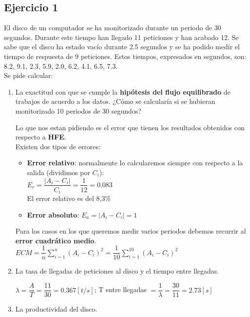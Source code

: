 \subsection{Ejercicio 1}
El disco de un computador se ha monitorizado durante un periodo de 30 segundos. Durante este tiempo
han llegado 11 peticiones y han acabado 12. Se sabe que el disco ha estado vacío durante 2.5 segundos y
se ha podido medir el tiempo de respuesta de 9 peticiones. Estos tiempos, expresados en segundos, son:\\
8.2, 9.1, 2.3, 5.9, 2.0, 6.2, 4.1, 6.5, 7.3. \\Se pide calcular:
\begin{enumerate}
    \item La exactitud con que se cumple la \textbf{hipótesis del flujo equilibrado} de trabajos de acuerdo a los datos. ¿Cómo se calcularía si se hubieran monitorizado 10 periodos de 30 segundos?
        \begin{tcolorbox}[colback=white,colframe=cyan!50!black,fonttitle=\bfseries]
        Lo que nos estan pidiendo es el error que tienen los resultados obtenidos con respecto a \textbf{HFE}.\\
        Existen dos tipos de errores:
        \begin{itemize}
            \item \textbf{Error relativo}: normalmente lo calcularemos siempre con respecto a la salida (dividimos por $C_i$):\\ $E_r=\dfrac{|A_i - C_i|}{C_i}=\dfrac{1}{12}=0.083$\\
            El error relativo es del 8,3\%
            \item \textbf{Error absoluto}: $E_a=|A_i-C_i|=1$
        \end{itemize}
        Para los casos en los que queremos medir varios periodos debemos recurrir al \textbf{error cuadrático medio}. $ECM = \dfrac{1}{n}\sum_{i=1}^{n}(A_i - C_i)^2 = \dfrac{1}{10}\sum_{i=1}^{10}(A_i - C_i)^2$
        \end{tcolorbox}
    \item La tasa de llegadas de peticiones al disco y el tiempo entre llegadas.
    \begin{tcolorbox}[colback=white,colframe=cyan!50!black,fonttitle=\bfseries]
$\lambda = \dfrac{A}{T}=\dfrac{11}{30}=0.367[t/s]$; T entre llegadas $ = \dfrac{1}{\lambda}=\dfrac{30}{11}=2.73[s]$
    \end{tcolorbox}
    \item La productividad del disco.
    \begin{tcolorbox}[colback=white,colframe=cyan!50!black,fonttitle=\bfseries]

\end{tcolorbox}
\end{enumerate}
